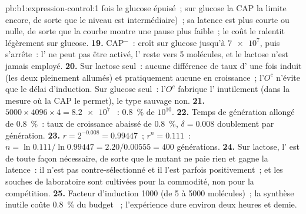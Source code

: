 \begin{solution}{pb:b1:expression-control:1}
fois le glucose épuisé~; sur glucose la CAP la limite encore, de sorte
que le niveau est intermédiaire)~; sa latence est plus courte ou nulle,
de sorte que la courbe montre une pause plus faible~; le coût le ralentit
légèrement sur glucose.
\textbf{19.} CAP$^-$~: croît sur glucose jusqu'à $\num{7e7}$, puis
s'arrête~: l' ne peut pas être activé, l' reste vers
5 molécules, et le lactose n'est jamais employé.
\textbf{20.} Sur lactose seul~: aucune différence de taux d' une
fois induit (les deux pleinement allumés) et pratiquement aucune en
croissance~; l'$O^c$ n'évite que le délai d'induction. Sur glucose
seul~: l'$O^c$ fabrique l' inutilement (dans la mesure où la CAP
le permet), le type sauvage non.
\textbf{21.} $5000\times 4096\times 4 = \num{8.2e7}$ ~: \qty{0.8}{\%}
de $10^{10}$.
\textbf{22.} Temps de génération allongé de \qty{0.8}{\%}~: taux de
croissance abaissé de \qty{0.8}{\%}, $\delta = 0.008$ doublement par
génération.
\textbf{23.} $r = 2^{-0.008} = 0.99447$~; $r^n = 0.111$~: $n =
\ln 0.111/\ln 0.99447 = 2.20/0.00555 = 400$ générations.
\textbf{24.} Sur lactose, l' est de toute façon nécessaire, de
sorte que le mutant ne paie rien et gagne la latence~: il n'est pas
contre-sélectionné et il l'est parfois positivement~; et les souches de
laboratoire sont cultivées pour la commodité, non pour la compétition.
\textbf{25.} Facteur d'induction 1000 (de 5 à \num{5000} molécules)~; la
synthèse inutile coûte \qty{0.8}{\%} du budget ~; l'expérience dure
environ deux heures et demie.
\end{solution}
